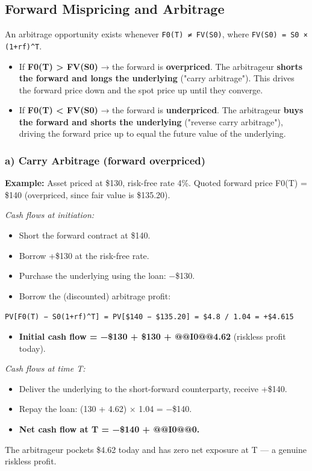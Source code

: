 \documentclass[12pt,openany]{book}
\theoremstyle{definition}
\theoremstyle{remark}
\begin{document}
\subsection{Forward Mispricing and Arbitrage}

An arbitrage opportunity exists whenever \texttt{F0(T) ≠ FV(S0)}, where \texttt{FV(S0) = S0 × (1+rf)\textasciicircum{}T}.

\begin{itemize}
\item If \textbf{F0(T) > FV(S0)} → the forward is \textbf{overpriced}. The arbitrageur \textbf{shorts the forward and longs the underlying} ("carry arbitrage"). This drives the forward price down and the spot price up until they converge.
\item If \textbf{F0(T) < FV(S0)} → the forward is \textbf{underpriced}. The arbitrageur \textbf{buys the forward and shorts the underlying} ("reverse carry arbitrage"), driving the forward price up to equal the future value of the underlying.
\end{itemize}
\subsubsection{a) Carry Arbitrage (forward overpriced)}

\textbf{Example:} Asset priced at \$130, risk-free rate 4\%. Quoted forward price F0(T) = \$140 (overpriced, since fair value is \$135.20).

\emph{Cash flows at initiation:}
\begin{itemize}
\item Short the forward contract at \$140.
\item Borrow +\$130 at the risk-free rate.
\item Purchase the underlying using the loan: −\$130.
\item Borrow the (discounted) arbitrage profit:
\end{itemize}
  \texttt{PV[F0(T) − S0(1+rf)\textasciicircum{}T] = PV[\$140 − \$135.20] = \$4.8 / 1.04 = +\$4.615}
\begin{itemize}
\item \textbf{Initial cash flow = −\$130 + \$130 + @@I0@@4.62} (riskless profit today).
\end{itemize}
\emph{Cash flows at time T:}
\begin{itemize}
\item Deliver the underlying to the short-forward counterparty, receive +\$140.
\item Repay the loan: (130 + 4.62) × 1.04 = −\$140.
\item \textbf{Net cash flow at T = −\$140 + @@I0@@0.}
\end{itemize}
The arbitrageur pockets \$4.62 today and has zero net exposure at T — a genuine riskless profit.
\end{document}
